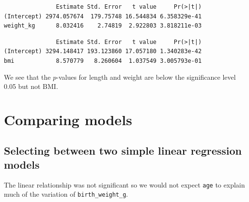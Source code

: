 \documentclass[
  letterpaper,
  DIV=11,
  numbers=noendperiod]{scrreprt}
\newenvironment{Shaded}{\begin{snugshade}}{\end{snugshade}}
\newcommand{\AttributeTok}[1]{\textcolor[rgb]{0.40,0.45,0.13}{#1}}
\newcommand{\CommentTok}[1]{\textcolor[rgb]{0.37,0.37,0.37}{#1}}
\newcommand{\FunctionTok}[1]{\textcolor[rgb]{0.28,0.35,0.67}{#1}}
\newcommand{\NormalTok}[1]{\textcolor[rgb]{0.00,0.23,0.31}{#1}}
\newcommand{\OtherTok}[1]{\textcolor[rgb]{0.00,0.23,0.31}{#1}}
\newcommand{\SpecialCharTok}[1]{\textcolor[rgb]{0.37,0.37,0.37}{#1}}
\begin{document}
\begin{verbatim}
               Estimate Std. Error   t value     Pr(>|t|)
(Intercept) 2974.057674  179.75748 16.544834 6.358329e-41
weight_kg      8.032416    2.74819  2.922803 3.818211e-03
\end{verbatim}

\begin{Shaded}
\end{Shaded}

\begin{verbatim}
               Estimate Std. Error   t value     Pr(>|t|)
(Intercept) 3294.148417 193.123860 17.057180 1.340283e-42
bmi            8.570779   8.260604  1.037549 3.005793e-01
\end{verbatim}

We see that the \(p\)-values for length and weight are below the
significance level 0.05 but not BMI.

\section{Comparing models}\label{comparing-models-1}

\subsection{Selecting between two simple linear regression
models}\label{selecting-between-two-simple-linear-regression-models-1}

The linear relationship was not significant so we would not expect
\texttt{age} to explain much of the variation of
\texttt{birth\_weight\_g}.

\begin{Shaded}
\end{Shaded}
\end{document}
